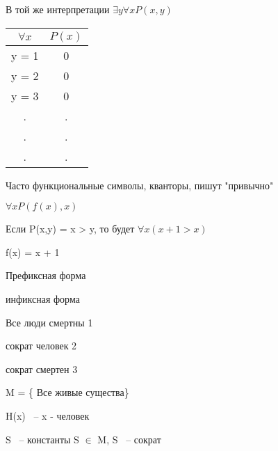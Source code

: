 \documentclass[russian]{lecture-notes}
\begin{document}
    \begin{example}

        В той же интерпретации $\exists y \forall x P(x,y)$

        \begin{table}[h!]
                \centering
                \begin{tabular}{|c|c|}
                    \hline
                    $\forall x $ & $P(x)$ \\ \hline
                    y = 1      & 0       \\ \hline
                    y = 2      & 0       \\ \hline
                    y = 3      & 0       \\ \hline
                    .      & .       \\ \hline
                    .      & .       \\ \hline
                    .      & .       \\ \hline
                \end{tabular}
            \end{table}

        \begin{remark}

            Часто функциональные символы, кванторы, пишут "привычно"

            \end{remark}

        $\forall x P(f(x),x)$

        Если P(x,y) = x > y, то будет $\forall x (x + 1 > x)$

        f(x) = x + 1

        Префиксная форма

        инфиксная форма

        \end{example}

    \begin{example}

        Все люди смертны 1

        сократ человек 2

        сократ смертен 3

        \end{example}

    M = \{ Все живые существа\}

    H(x) ~-- x - человек

    S ~-- константы S $\in$ M, S ~-- сократ
\end{document}
